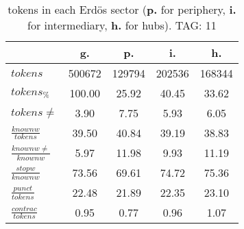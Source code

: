 \begin{table}[h!]
\begin{center}
\begin{tabular}{| l | c | c | c | c |}\hline
 & g. & p. & i. & h. \\\hline
$tokens$ & 500672  & 129794  & 202536  & 168344 \\\hline
$tokens_{\%}$ & 100.00  & 25.92  & 40.45  & 33.62 \\\hline
$tokens \neq$ & 3.90  & 7.75  & 5.93  & 6.05 \\\hline
$\frac{knownw}{tokens}$ & 39.50  & 40.84  & 39.19  & 38.83 \\\hline
$\frac{knownw \neq}{knownw}$ & 5.97  & 11.98  & 9.93  & 11.19 \\\hline
$\frac{stopw}{knownw}$ & 73.56  & 69.61  & 74.72  & 75.36 \\\hline
$\frac{punct}{tokens}$ & 22.48  & 21.89  & 22.35  & 23.10 \\\hline
$\frac{contrac}{tokens}$ & 0.95  & 0.77  & 0.96  & 1.07 \\\hline
\end{tabular}
\caption{tokens in each Erd\"os sector ({{\bf p.}} for periphery, {{\bf i.}} for intermediary, 
    {{\bf h.}} for hubs). TAG: 11}
\end{center}
\end{table}